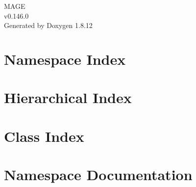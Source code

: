 \documentclass[twoside]{book}
\newcommand{\+}{\discretionary{\mbox{\scriptsize$\hookleftarrow$}}{}{}}
\newcommand{\clearemptydoublepage}{%
  \newpage{\pagestyle{empty}\cleardoublepage}%
}
\begin{document}
\hypersetup{pageanchor=false,
             bookmarksnumbered=true,
             pdfencoding=unicode
            }
\begin{titlepage}
\vspace*{7cm}
\begin{center}%
{\Large M\+A\+GE \\[1ex]\large v0.\+146.\+0 }\\
\vspace*{1cm}
{\large Generated by Doxygen 1.8.12}\\
\end{center}
\end{titlepage}
\clearemptydoublepage
{}
\tableofcontents
\clearemptydoublepage
{}
\hypersetup{pageanchor=true}

\chapter{Namespace Index}

\chapter{Hierarchical Index}

\chapter{Class Index}

\chapter{Namespace Documentation}








\end{document}
